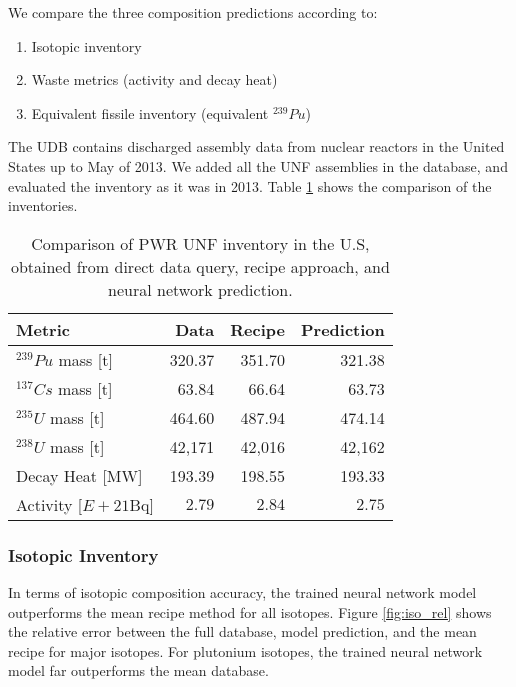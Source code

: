 We compare the three composition predictions according to:
\begin{enumerate}
    \item Isotopic inventory
    \item Waste metrics (activity and decay heat)
    \item Equivalent fissile inventory (equivalent $^{239}Pu$)
\end{enumerate}

The \gls{UDB} contains discharged assembly data
from nuclear reactors in the United States up to May of
2013. We added all the \gls{UNF} assemblies in the database,
and evaluated the inventory as it was in 2013. 
Table \ref{tab:met} shows the comparison of the inventories.

\begin{table}[h]
    \centering
    \begin{tabular}{l|r|rr}
        \hline
        Metric & Data & Recipe & Prediction \\
        \hline
        $^{239}Pu$ mass [t] & 320.37 & 351.70 & 321.38\\
        $^{137}Cs$ mass [t] & 63.84 & 66.64 & 63.73 \\
        $^{235}U$ mass [t] & 464.60 & 487.94 & 474.14\\
        $^{238}U$ mass [t] & 42,171 & 42,016 & 42,162\\
        \hline
        Decay Heat [MW] & 193.39 & 198.55 & 193.33 \\
        Activity [$E+21$Bq] & $2.79$ & $2.84$ & $2.75$ \\
        \hline
    \end{tabular}
    \caption{Comparison of \gls{PWR} \gls{UNF} inventory in the U.S,
             obtained from direct data query, recipe approach,
             and neural network prediction. 
    \label{tab:met}}
\end{table}

\FloatBarrier

\subsubsection{Isotopic Inventory}

In terms of isotopic composition accuracy, the trained
neural network model outperforms the
mean recipe method for all isotopes.
Figure \ref{fig:iso_rel} shows the relative
error between the full database, model prediction, and
the mean recipe for
major isotopes. For plutonium isotopes, the trained neural
network model far
outperforms the mean database.

